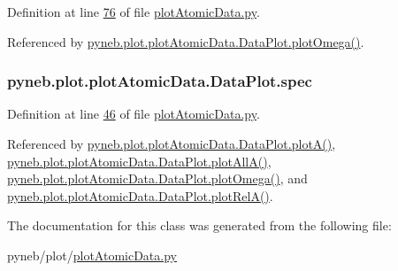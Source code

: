 Definition at line \hyperlink{plot_atomic_data_8py_source_l00076}{76} of file \hyperlink{plot_atomic_data_8py_source}{plot\-Atomic\-Data.\-py}.



Referenced by \hyperlink{plot_atomic_data_8py_source_l00373}{pyneb.\-plot.\-plot\-Atomic\-Data.\-Data\-Plot.\-plot\-Omega()}.

\hypertarget{classpyneb_1_1plot_1_1plot_atomic_data_1_1_data_plot_acaaca83a6e12e99ebc1da72af5f8c60a}{
\subsubsection[{spec}]{\setlength{\rightskip}{0pt plus 5cm}pyneb.\-plot.\-plot\-Atomic\-Data.\-Data\-Plot.\-spec}}\label{classpyneb_1_1plot_1_1plot_atomic_data_1_1_data_plot_acaaca83a6e12e99ebc1da72af5f8c60a}


Definition at line \hyperlink{plot_atomic_data_8py_source_l00046}{46} of file \hyperlink{plot_atomic_data_8py_source}{plot\-Atomic\-Data.\-py}.



Referenced by \hyperlink{plot_atomic_data_8py_source_l00117}{pyneb.\-plot.\-plot\-Atomic\-Data.\-Data\-Plot.\-plot\-A()}, \hyperlink{plot_atomic_data_8py_source_l00189}{pyneb.\-plot.\-plot\-Atomic\-Data.\-Data\-Plot.\-plot\-All\-A()}, \hyperlink{plot_atomic_data_8py_source_l00373}{pyneb.\-plot.\-plot\-Atomic\-Data.\-Data\-Plot.\-plot\-Omega()}, and \hyperlink{plot_atomic_data_8py_source_l00262}{pyneb.\-plot.\-plot\-Atomic\-Data.\-Data\-Plot.\-plot\-Rel\-A()}.



The documentation for this class was generated from the following file\-:\begin{DoxyCompactItemize}
\item 
pyneb/plot/\hyperlink{plot_atomic_data_8py}{plot\-Atomic\-Data.\-py}\end{DoxyCompactItemize}
